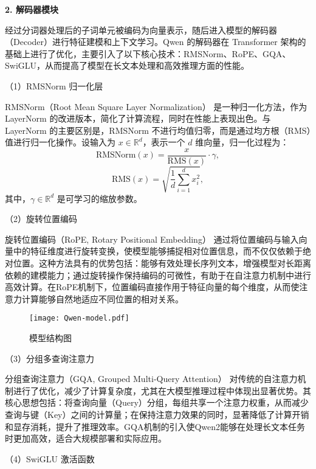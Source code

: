 \textbf{2. 解码器模块}

经过分词器处理后的子词单元被编码为向量表示，随后进入模型的解码器（Decoder）进行特征建模和上下文学习。Qwen 的解码器在 Transformer 架构的基础上进行了优化，主要引入了以下核心技术：RMSNorm、RoPE、GQA、SwiGLU，从而提高了模型在长文本处理和高效推理方面的性能。

（1）RMSNorm 归一化层

RMSNorm（Root Mean Square Layer Normalization）\cite{Zhang_Sennrich_2019} 是一种归一化方法，作为 LayerNorm\cite{Ba_Kiros_Hinton_2016} 的改进版本，简化了计算流程，同时在性能上表现出色。与 LayerNorm 的主要区别是，RMSNorm 不进行均值归零，而是通过均方根（RMS）值进行归一化操作。设输入为 $x \in \mathbb{R}^d$，表示一个 $d$ 维向量，归一化过程为：
\begin{equation}
  \text{RMSNorm}(x) = \frac{x}{\text{RMS}(x)} \cdot \gamma,
\end{equation}
\begin{equation}
  \text{RMS}(x) = \sqrt{\frac{1}{d} \sum_{i=1}^d x_i^2},
\end{equation}
其中，$\gamma \in \mathbb{R}^d$ 是可学习的缩放参数。

（2）旋转位置编码

旋转位置编码（RoPE, Rotary Positional Embedding）\cite{Su_Lu_Pan_Wen_Liu_2021} 通过将位置编码与输入向量中的特征维度进行旋转变换，使模型能够捕捉相对位置信息，而不仅仅依赖于绝对位置。这种方法具有的优势包括：能够有效处理长序列文本，增强模型对长距离依赖的建模能力；通过旋转操作保持编码的可微性，有助于在自注意力机制中进行高效计算。在RoPE机制下，位置编码直接作用于特征向量的每个维度，从而使注意力计算能够自然地适应不同位置的相对关系。

\begin{figure}[ht]
  \centering
  \texttt{[image: Qwen-model.pdf]}
  \caption{模型结构图}
  \label{fig:Qwen-model}
\end{figure}

（3）分组多查询注意力

分组查询注意力（GQA, Grouped Multi-Query Attention）\cite{ainslie2023gqatraininggeneralizedmultiquery} 对传统的自注意力机制进行了优化，减少了计算复杂度，尤其在大模型推理过程中体现出显著优势。其核心思想包括：将查询向量（Query）分组，每组共享一个注意力权重，从而减少查询与键（Key）之间的计算量；在保持注意力效果的同时，显著降低了计算开销和显存消耗，提升了推理效率。GQA机制的引入使Qwen2能够在处理长文本任务时更加高效，适合大规模部署和实际应用。

（4）SwiGLU 激活函数

